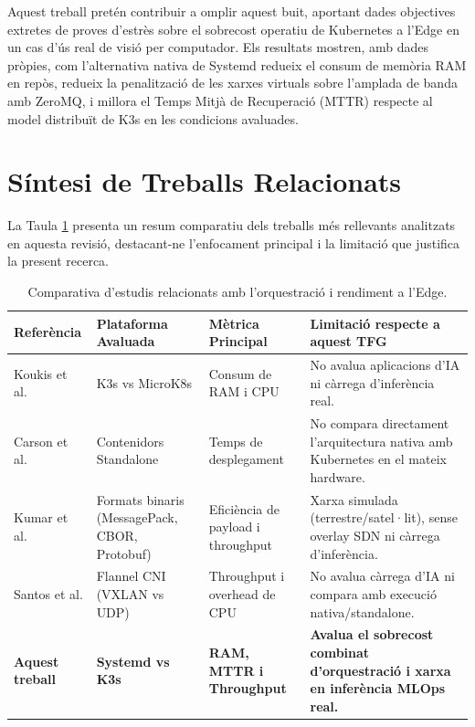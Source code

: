 Aquest treball pretén contribuir a omplir aquest buit, aportant dades objectives extretes de proves d'estrès sobre el sobrecost operatiu de Kubernetes a l'Edge en un cas d'ús real de visió per computador. Els resultats mostren, amb dades pròpies, com l'alternativa nativa de Systemd redueix el consum de memòria RAM en repòs, redueix la penalització de les xarxes virtuals sobre l'amplada de banda amb ZeroMQ, i millora el Temps Mitjà de Recuperació (MTTR) respecte al model distribuït de K3s en les condicions avaluades.

\section{Síntesi de Treballs Relacionats}
\label{sec:sintesi_estat_art}

La Taula \ref{tab:estat_art} presenta un resum comparatiu dels treballs més rellevants analitzats en aquesta revisió, destacant-ne l'enfocament principal i la limitació que justifica la present recerca.

\begin{table}[htbp]
    \centering
    \renewcommand{\arraystretch}{1.2}
    \small
    \setlength{\tabcolsep}{4pt}
    \begin{tabular}{p{2.8cm} p{3.7cm} p{3cm} p{6.4cm}}
    \toprule
    \textbf{Referència} & \textbf{Plataforma Avaluada} & \textbf{Mètrica Principal} & \textbf{Limitació respecte a aquest TFG} \\
    \midrule
    Koukis et al. \cite{koukis2024performance} & K3s vs MicroK8s & Consum de RAM i CPU & No avalua aplicacions d'IA ni càrrega d'inferència real. \\
    \addlinespace
    Carson et al. \cite{carson2025selfhealing} & Contenidors Standalone & Temps de desplegament & No compara directament l'arquitectura nativa amb Kubernetes en el mateix hardware. \\
    \addlinespace
    Kumar et al. \cite{kumar2026evaluating} & Formats binaris (MessagePack, CBOR, Protobuf) & Eficiència de payload i throughput & Xarxa simulada (terrestre/satel·lit), sense overlay SDN ni càrrega d'inferència. \\
    \addlinespace
    Santos et al. \cite{santos2025comprehensive} & Flannel CNI (VXLAN vs UDP) & Throughput i overhead de CPU & No avalua càrrega d'IA ni compara amb execució nativa/standalone. \\
    \addlinespace
    \textbf{Aquest treball} & \textbf{Systemd vs K3s} & \textbf{RAM, MTTR i Throughput} & \textbf{Avalua el sobrecost combinat d'orquestració i xarxa en inferència MLOps real.} \\
    \bottomrule
    \end{tabular}
    \caption{Comparativa d'estudis relacionats amb l'orquestració i rendiment a l'Edge.}
    \label{tab:estat_art}
\end{table}
